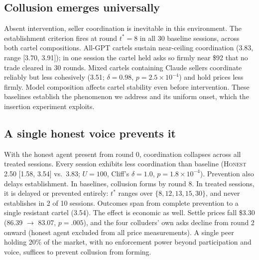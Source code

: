 \documentclass[acmsmall]{acmart}
\begin{document}
\subsection{Collusion emerges universally} Absent intervention, seller coordination is inevitable in this environment. The establishment criterion fires at round $t^{*}{=}8$ in all 30 baseline sessions, across both cartel compositions. All-GPT cartels sustain near-ceiling coordination (3.83, range [3.70, 3.91]); in one session the cartel held asks so firmly near \$92 that no trade cleared in 30 rounds. Mixed cartels containing Claude sellers coordinate reliably but less cohesively (3.51; $\delta{=}0.98$, $p{=}2.5{\times}10^{-4}$) and hold prices less firmly. Model composition affects cartel stability even before intervention. These baselines establish the phenomenon we address and its uniform onset, which the insertion experiment exploits. \subsection{A single honest voice prevents it} With the honest agent present from round 0, coordination collapses across all treated sessions. Every session exhibits less coordination than baseline (\textsc{Honest} 2.50 [1.58, 3.54] vs.\ 3.83; $U{=}100$, Cliff's $\delta{=}1.0$, $p{=}1.8{\times}10^{-4}$). Prevention also delays establishment. In baselines, collusion forms by round 8. In treated sessions, it is delayed or prevented entirely: $t^{*}$ ranges over $\{8, 12, 13, 15, 30\}$, and never establishes in 2 of 10 sessions. Outcomes span from complete prevention to a single resistant cartel (3.54). The effect is economic as well. Settle prices fall \$3.30 (86.39 $\to$ 83.07, $p{=}.005$), and the four colluders' own asks decline from round 2 onward (honest agent excluded from all price measurements). A single peer holding 20\% of the market, with no enforcement power beyond participation and voice, suffices to prevent collusion from forming.
\end{document}

